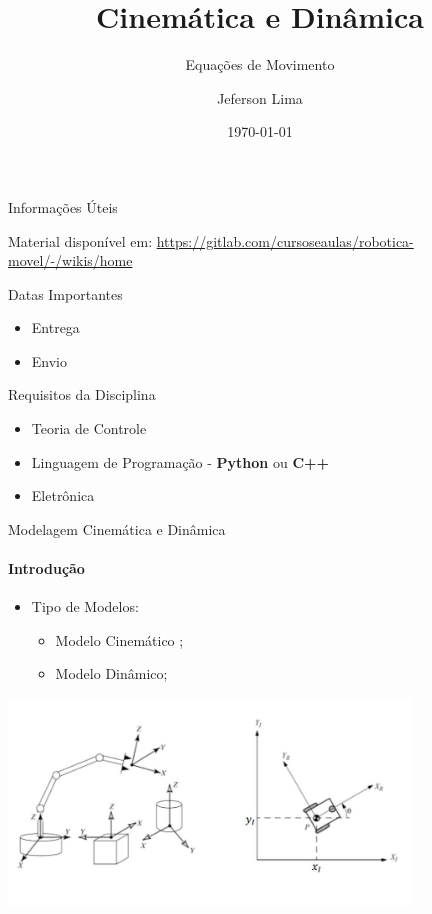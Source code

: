 \documentclass{beamer}
\title{Cinemática e Dinâmica}
\subtitle{Equações de Movimento}
\date{\today}
\author{Jeferson Lima}
\institute{\url{http://gitlab.com/jeferson.lima}}
\newcommand{\cmark}{\textcolor{green}{\ding{51}}}%
\newcommand{\pausar}{\pause}
\begin{document}
\maketitle

\begin{frame}{Informações Úteis}
    \begin{block}{Material disponível em:}
        \href{Robótica Móvel - Wiki}{https://gitlab.com/cursoseaulas/robotica-movel/-/wikis/home}
    \end{block}
    \pausar
    \begin{block}{Datas Importantes}
        \begin{itemize}
            \item Entrega
            \item Envio
        \end{itemize}
    \end{block}
    \pausar
    \begin{block}{Requisitos da Disciplina}
        \begin{itemize}
            \item Teoria de Controle
            \item Linguagem de Programação - \textbf{Python} ou \textbf{C++}
            \item Eletrônica
        \end{itemize}
    \end{block}
    \robotfolder
    
\end{frame}


\begin{frame}{Modelagem Cinemática e Dinâmica}
    \framesubtitle{Introdução}
    \begin{itemize}
        \item Tipo de Modelos:
              \begin{itemize}
                  \item Modelo Cinemático \cmark;
                  \item Modelo Dinâmico;
              \end{itemize}
    \end{itemize}
    \begin{center}
        \includegraphics[width=0.8\textwidth]{../images/mecanismos.jpg}
    \end{center}
\end{frame}
\end{document}
